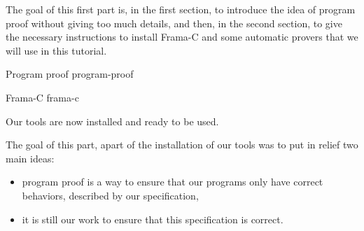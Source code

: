 The goal of this first part is, in the first section, to introduce the
idea of program proof without giving too much details, and then, in the
second section, to give the necessary instructions to install Frama-C
and some automatic provers that we will use in this tutorial.



\begin{levelTwo}
  {Program proof}
  {program-proof}
\end{levelTwo}

\begin{levelTwo}
  {Frama-C}
  {frama-c}
\end{levelTwo}



\horizontalLine
\newpage


Our tools are now installed and ready to be used.



The goal of this part, apart of the installation of our tools was to put
in relief two main ideas:


\begin{itemize}
\item program proof is a way to ensure that our programs only have correct
  behaviors, described by our specification,
\item it is still our work to ensure that this specification is correct.
\end{itemize}
